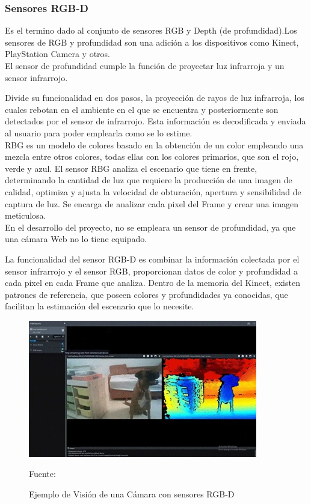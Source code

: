 \subsubsection{Sensores RGB-D} 

Es el termino dado al conjunto de sensores RGB y Depth (de profundidad).Los sensores de RGB y profundidad son una adición a los dispositivos como Kinect, PlayStation Camera y otros. 
\\El sensor de profundidad cumple la función de proyectar luz infrarroja y un sensor infrarrojo. 

Divide su funcionalidad en dos pasos, la proyección de rayos de luz infrarroja, los cuales rebotan en el ambiente en el que se encuentra y posteriormente son detectados por el sensor de infrarrojo. Esta información es decodificada y enviada al usuario para poder emplearla como se lo estime.
\\
RBG es un modelo de colores basado en la obtención de un color empleando una mezcla entre otros colores, todas ellas con los colores primarios, que son el rojo, verde y azul. 
El sensor RBG analiza el escenario que tiene en frente, determinando la cantidad de luz que requiere la producción de una imagen de calidad, optimiza y ajusta la velocidad de obturación, apertura y sensibilidad de captura de luz. 
Se encarga de analizar cada pixel del Frame y crear una imagen meticulosa.
\\
En el desarrollo del proyecto, no se empleara un sensor de profundidad, ya que una cámara Web no lo tiene equipado.

La funcionalidad del sensor RGB-D es combinar la información colectada por el sensor infrarrojo y el sensor RGB, proporcionan datos de color y profundidad a cada pixel en cada Frame que analiza. Dentro de la memoria del Kinect, existen patrones de referencia, que poseen colores y profundidades ya conocidas, que facilitan la estimación del escenario que lo necesite\cite{litomisky2012consumer}.  
\begin{figure}[t!]
	\centering
	\includegraphics[width=10cm,height=6cm,]{./Images/RGBandDepth.jpg}
	\caption{Ejemplo de Visión de una Cámara con sensores RGB-D}
	\footnotesize Fuente: \cite{RGBandDepth}
	\label{RGBandDepth}
\end{figure}



